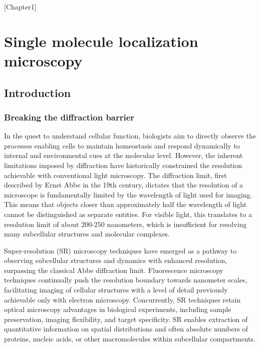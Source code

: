 [Chapter1]

\chapter{Single molecule localization microscopy}

\section{Introduction}

\subsection{Breaking the diffraction barrier}

In the quest to understand cellular function, biologists aim to directly observe the processes enabling cells to maintain homeostasis and respond dynamically to internal and environmental cues at the molecular level. However, the inherent limitations imposed by diffraction have historically constrained the resolution achievable with conventional light microscopy. The diffraction limit, first described by Ernst Abbe in the 19th century, dictates that the resolution of a microscope is fundamentally limited by the wavelength of light used for imaging. This means that objects closer than approximately half the wavelength of light cannot be distinguished as separate entities. For visible light, this translates to a resolution limit of about 200-250 nanometers, which is insufficient for resolving many subcellular structures and molecular complexes.

Super-resolution (SR) microscopy techniques have emerged as a pathway to observing subcellular structures and dynamics with enhanced resolution, surpassing the classical Abbe diffraction limit. Fluorescence microscopy techniques continually push the resolution boundary towards nanometer scales, facilitating imaging of cellular structures with a level of detail previously achievable only with electron microscopy. Concurrently, SR techniques retain optical microscopy advantages in biological experiments, including sample preservation, imaging flexibility, and target specificity. SR enables extraction of quantitative information on spatial distributions and often absolute numbers of proteins, nucleic acids, or other macromolecules within subcellular compartments. \parencite{Kong2013}

